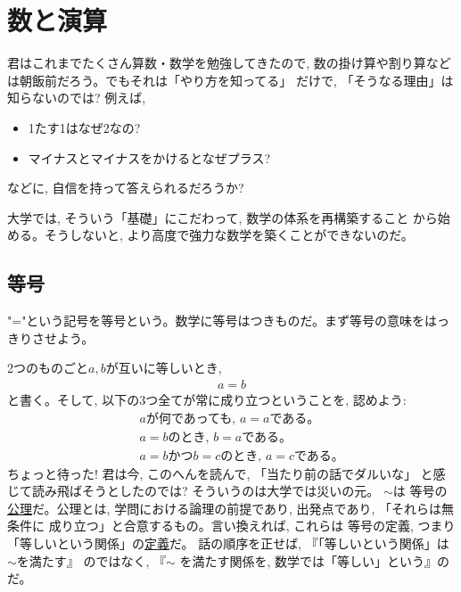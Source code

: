\chapter{数と演算}\label{chapt:num_calc}




君はこれまでたくさん算数・数学を勉強してきたので, 
数の掛け算や割り算などは朝飯前だろう。でもそれは「やり方を知ってる」
だけで, 「そうなる理由」は知らないのでは? 例えば, 
\begin{itemize}
\item 1たす1はなぜ2なの?
\item マイナスとマイナスをかけるとなぜプラス?
\end{itemize}
などに, 自信を持って答えられるだろうか?

大学では, そういう「基礎」にこだわって, 数学の体系を再構築すること
から始める。そうしないと, より高度で強力な数学を築くことができないのだ。\\


\section{等号}\label{sec:equality}

"="という記号を等号という。数学に等号はつきものだ。まず等号の意味をはっきりさせよう。

2つのものごと$a, b$が互いに等しいとき, 
\begin{eqnarray}a=b\end{eqnarray}
と書く。そして, 以下の3つ全てが常に成り立つということを, 認めよう:
\begin{eqnarray}
&&\text{$a$が何であっても, $a=a$である。}\label{eq:equality01}\\
&&\text{$a=b$のとき, $b=a$である。}\label{eq:equality02}\\
&&\text{$a=b$かつ$b=c$のとき, $a=c$である。}\label{eq:equality03}
\end{eqnarray}
ちょっと待った! 君は今, このへんを読んで, 「当たり前の話でダルいな」
と感じて読み飛ばそうとしたのでは? そういうのは大学では災いの元。
$\sim$は
等号の\underline{公理}だ。公理とは, 
学問における論理の前提であり, 出発点であり, 「それらは無条件に
成り立つ」と合意するもの。言い換えれば, これらは
等号の定義, つまり「等しいという関係」の\underline{定義}だ。
話の順序を正せば, 『「等しいという関係」は
$\sim$を満たす』
のではなく, 
『$\sim$
を満たす関係を, 数学では「等しい」という』のだ。\mv

